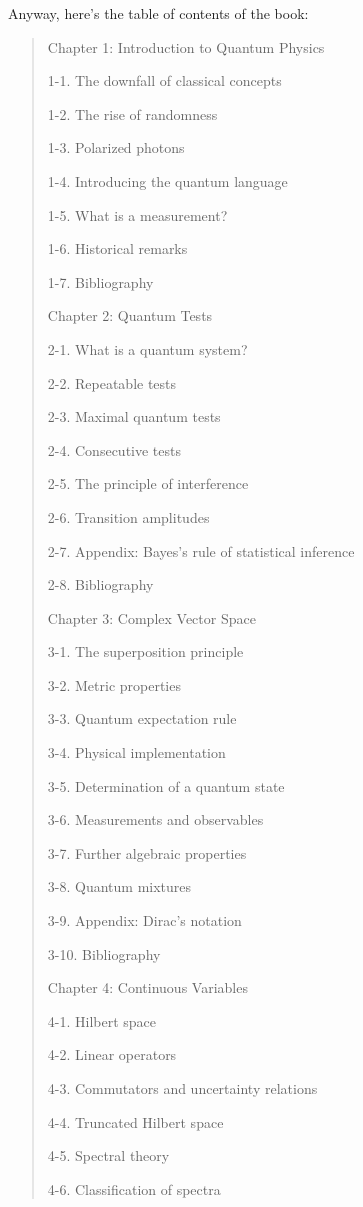 \documentclass{article}
\begin{document}
Anyway, here's the table of contents of the book:

\begin{quote}
{\rm
Chapter 1: Introduction to Quantum Physics

1-1. The downfall of classical concepts 

1-2. The rise of randomness 

1-3. Polarized photons 

1-4. Introducing the quantum language 

1-5. What is a measurement? 

1-6. Historical remarks 

1-7. Bibliography 

Chapter 2: Quantum Tests

2-1. What is a quantum system? 

2-2. Repeatable tests 

2-3. Maximal quantum tests 

2-4. Consecutive tests 

2-5. The principle of interference 

2-6. Transition amplitudes 

2-7. Appendix: Bayes's rule of statistical inference 

2-8. Bibliography 

Chapter 3: Complex Vector Space

3-1. The superposition principle 

3-2. Metric properties 

3-3. Quantum expectation rule 

3-4. Physical implementation 

3-5. Determination of a quantum state 

3-6. Measurements and observables 

3-7. Further algebraic properties 

3-8. Quantum mixtures 

3-9. Appendix: Dirac's notation 

3-10. Bibliography 

Chapter 4: Continuous Variables

4-1. Hilbert space 

4-2. Linear operators 

4-3. Commutators and uncertainty relations 

4-4. Truncated Hilbert space 

4-5. Spectral theory 

4-6. Classification of spectra 

}
\end{quote}
\end{document}
